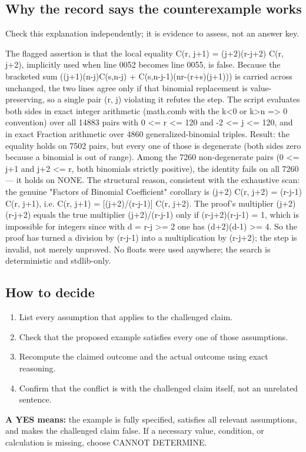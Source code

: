 \documentclass[11pt]{article}
\begin{document}
\subsection*{Why the record says the counterexample works}
Check this explanation independently; it is evidence to assess, not an answer key.
\begin{Vsrc}
The flagged assertion is that the local equality C(r, j+1) = (j+2)(r-j+2) C(r, j+2), implicitly used when line 0052 becomes line 0055, is false. Because the bracketed sum ((j+1)(n-j)C(s,n-j) + C(s,n-j-1)(nr-(r+s)(j+1))) is carried across unchanged, the two lines agree only if that binomial replacement is value-preserving, so a single pair (r, j) violating it refutes the step. The script evaluates both sides in exact integer arithmetic (math.comb with the k<0 or k>n => 0 convention) over all 14883 pairs with 0 <= r <= 120 and -2 <= j <= 120, and in exact Fraction arithmetic over 4860 generalized-binomial triples. Result: the equality holds on 7502 pairs, but every one of those is degenerate (both sides zero because a binomial is out of range). Among the 7260 non-degenerate pairs (0 <= j+1 and j+2 <= r, both binomials strictly positive), the identity fails on all 7260 — it holds on NONE. The structural reason, consistent with the exhaustive scan: the genuine "Factors of Binomial Coefficient" corollary is (j+2) C(r, j+2) = (r-j-1) C(r, j+1), i.e. C(r, j+1) = [(j+2)/(r-j-1)] C(r, j+2). The proof's multiplier (j+2)(r-j+2) equals the true multiplier (j+2)/(r-j-1) only if (r-j+2)(r-j-1) = 1, which is impossible for integers since with d = r-j >= 2 one has (d+2)(d-1) >= 4. So the proof has turned a division by (r-j-1) into a multiplication by (r-j+2); the step is invalid, not merely unproved. No floats were used anywhere; the search is deterministic and stdlib-only.
\end{Vsrc}
\subsection*{How to decide}
\begin{enumerate}
\item List every assumption that applies to the challenged claim.
\item Check that the proposed example satisfies every one of those assumptions.
\item Recompute the claimed outcome and the actual outcome using exact reasoning.
\item Confirm that the conflict is with the challenged claim itself, not an unrelated sentence.
\end{enumerate}
\textbf{A YES means:} the example is fully specified, satisfies all relevant assumptions, and makes the challenged claim false. If a necessary value, condition, or calculation is missing, choose CANNOT DETERMINE.
\end{document}
